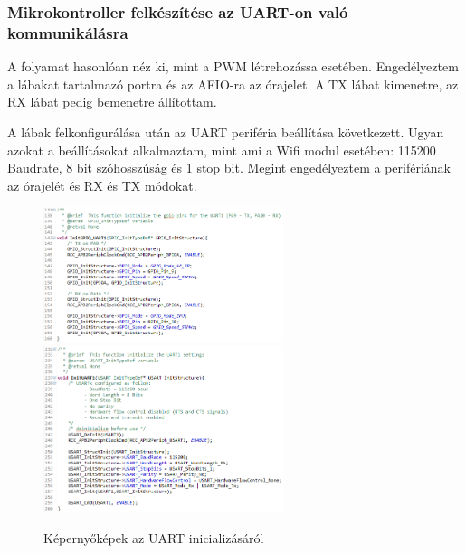 \documentclass[../main.tex]{subfiles}
\begin{document}
        \subsubsection{Mikrokontroller felkészítése az UART-on való kommunikálásra}
            A folyamat hasonlóan néz ki, mint a PWM létrehozássa esetében. Engedélyeztem a lábakat tartalmazó portra és az AFIO-ra az órajelet. A TX lábat kimenetre, az RX lábat pedig bemenetre állítottam.
            
            A lábak felkonfigurálása után az UART periféria beállítása következett. Ugyan azokat a beállításokat alkalmaztam, mint ami a Wifi modul esetében: 115200 Baudrate, 8 bit szóhosszúság és 1 stop bit. Megint engedélyeztem a perifériának az órajelét és RX és TX módokat.  
            \begin{figure}[h!]
                \centering
                    \includegraphics[width=7cm]{mbed_res/uart_init_gpio}
                    \includegraphics[width=7cm]{mbed_res/uart_init}
                \caption{Képernyőképek az UART inicializásáról}
                \label{fig:uart_init}
            \end{figure}
            
\end{document}
